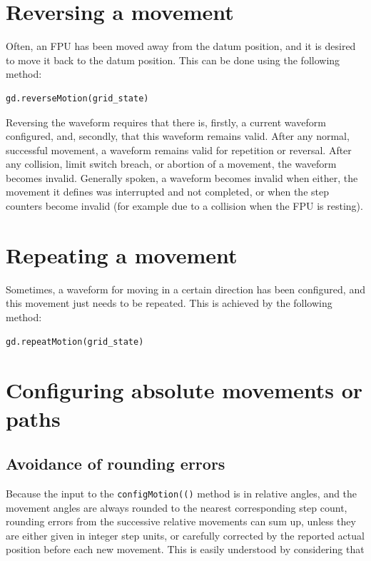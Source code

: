 \documentclass[fontsize=12,a4paper]{scrreprt}
\begin{document}
\section{Reversing a movement}
Often, an FPU has been moved away from the datum position, and it is
desired to move it back to the datum position.  This can be done using
the following method:

\begin{verbatim}
gd.reverseMotion(grid_state)
\end{verbatim}

Reversing the waveform requires that there is, firstly, a current
waveform configured, and, secondly, that this waveform remains valid.
After any normal, successful movement, a waveform remains valid for
repetition or reversal. After any collision, limit switch breach, or
abortion of a movement, the waveform becomes invalid. Generally
spoken, a waveform becomes invalid when either, the movement it
defines was interrupted and not completed, or when the step counters
become invalid (for example due to a collision when the FPU is
resting).


\section{Repeating a movement}
Sometimes, a waveform for moving in a certain direction has been
configured, and this movement just needs to be repeated.  This is
achieved by the following method:

\begin{verbatim}
gd.repeatMotion(grid_state)
\end{verbatim}


\section{Configuring absolute movements or paths}
\label{sec:configuringmovementpaths}

\subsection{Avoidance of rounding errors}
%
%
%
%
%
Because the input to the \texttt{configMotion(()} method is in
relative angles, and the movement angles are always rounded to the
nearest corresponding step count, rounding errors from the successive
relative movements can sum up, unless they are either given in integer
step units, or carefully corrected by the reported actual position
before each new movement. This is easily understood by considering that
\end{document}

